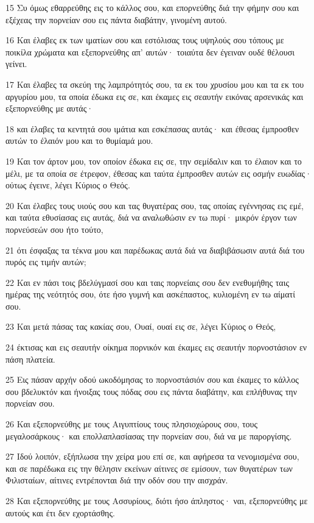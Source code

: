 \par 15 Συ όμως εθαρρεύθης εις το κάλλος σου, και επορνεύθης διά την φήμην σου και εξέχεας την πορνείαν σου εις πάντα διαβάτην, γινομένη αυτού.
\par 16 Και έλαβες εκ των ιματίων σου και εστόλισας τους υψηλούς σου τόπους με ποικίλα χρώματα και εξεπορνεύθης απ' αυτών· τοιαύτα δεν έγειναν ουδέ θέλουσι γείνει.
\par 17 Και έλαβες τα σκεύη της λαμπρότητός σου, τα εκ του χρυσίου μου και τα εκ του αργυρίου μου, τα οποία έδωκα εις σε, και έκαμες εις σεαυτήν εικόνας αρσενικάς και εξεπορνεύθης με αυτάς·
\par 18 και έλαβες τα κεντητά σου ιμάτια και εσκέπασας αυτάς· και έθεσας έμπροσθεν αυτών το έλαιόν μου και το θυμίαμά μου.
\par 19 Και τον άρτον μου, τον οποίον έδωκα εις σε, την σεμίδαλιν και το έλαιον και το μέλι, με τα οποία σε έτρεφον, έθεσας και ταύτα έμπροσθεν αυτών εις οσμήν ευωδίας· ούτως έγεινε, λέγει Κύριος ο Θεός.
\par 20 Και έλαβες τους υιούς σου και τας θυγατέρας σου, τας οποίας εγέννησας εις εμέ, και ταύτα εθυσίασας εις αυτάς, διά να αναλωθώσιν εν τω πυρί· μικρόν έργον των πορνεύσεών σου ήτο τούτο,
\par 21 ότι έσφαξας τα τέκνα μου και παρέδωκας αυτά διά να διαβιβάσωσιν αυτά διά του πυρός εις τιμήν αυτών;
\par 22 Και εν πάσι τοις βδελύγμασί σου και ταις πορνείαις σου δεν ενεθυμήθης ταις ημέρας της νεότητός σου, ότε ήσο γυμνή και ασκέπαστος, κυλιομένη εν τω αίματί σου.
\par 23 Και μετά πάσας τας κακίας σου, Ουαί, ουαί εις σε, λέγει Κύριος ο Θεός,
\par 24 έκτισας και εις σεαυτήν οίκημα πορνικόν και έκαμες εις σεαυτήν πορνοστάσιον εν πάση πλατεία.
\par 25 Εις πάσαν αρχήν οδού ωκοδόμησας το πορνοστάσιόν σου και έκαμες το κάλλος σου βδελυκτόν και ήνοιξας τους πόδας σου εις πάντα διαβάτην, και επλήθυνας την πορνείαν σου.
\par 26 Και εξεπορνεύθης με τους Αιγυπτίους τους πλησιοχώρους σου, τους μεγαλοσάρκους· και επολλαπλασίασας την πορνείαν σου, διά να με παροργίσης.
\par 27 Ιδού λοιπόν, εξήπλωσα την χείρα μου επί σε, και αφήρεσα τα νενομισμένα σου, και σε παρέδωκα εις την θέλησιν εκείνων αίτινες σε εμίσουν, των θυγατέρων των Φιλισταίων, αίτινες εντρέπονται διά την οδόν σου την αισχράν.
\par 28 Και εξεπορνεύθης με τους Ασσυρίους, διότι ήσο άπληστος· ναι, εξεπορνεύθης με αυτούς και έτι δεν εχορτάσθης.
